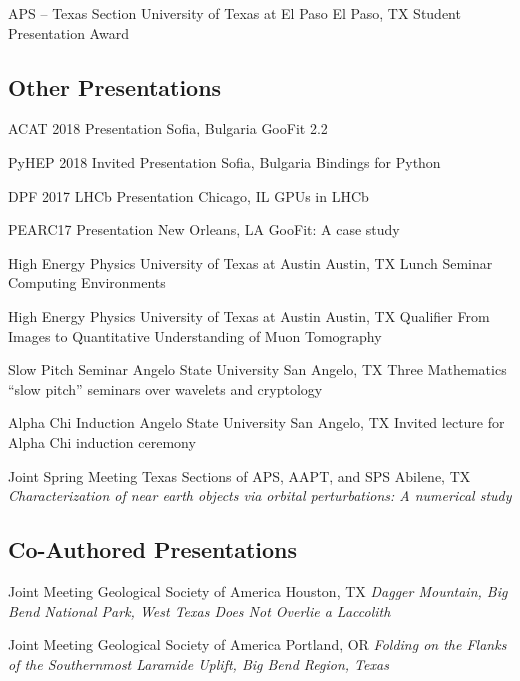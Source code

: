 \documentclass[10pt,letterpaper,english]{moderncv}
\begin{document}
{APS -- Texas Section}
{University of Texas at El Paso}
{El Paso, TX}
{Student Presentation Award}


\subsection{Other Presentations}

{ACAT 2018}
{Presentation}
{Sofia, Bulgaria}
{GooFit 2.2}

{PyHEP 2018}
{Invited Presentation}
{Sofia, Bulgaria}
{Bindings for Python}

{DPF 2017}
{LHCb Presentation}
{Chicago, IL}
{GPUs in LHCb}

{PEARC17}
{Presentation}
{New Orleans, LA}
{GooFit: A case study}


{High Energy Physics}
{University of Texas at Austin}
{Austin, TX}
{Lunch Seminar}%
{Computing Environments}

{High Energy Physics}
{University of Texas at Austin}
{Austin, TX}
{Qualifier}%
{From Images to Quantitative Understanding of Muon Tomography}

{Slow Pitch Seminar}
{Angelo State University}
{San Angelo, TX}
{Three Mathematics ``slow pitch'' seminars over wavelets and cryptology}

{Alpha Chi Induction}
{Angelo State University}
{San Angelo, TX}
{Invited lecture for Alpha Chi induction ceremony}

{Joint Spring Meeting}
{Texas Sections of APS, AAPT, and SPS}
{Abilene, TX}
{\emph{Characterization of near earth objects via orbital perturbations: A numerical study}} %


\subsection{Co-Authored Presentations}

{Joint Meeting}
{Geological Society of America}
{Houston, TX}
{\emph{Dagger Mountain, Big Bend National Park, West Texas Does Not Overlie a Laccolith}}

{Joint Meeting}
{Geological Society of America}
{Portland, OR}
{\emph{Folding on the Flanks of the Southernmost Laramide Uplift, Big Bend Region, Texas}}

\end{document}
